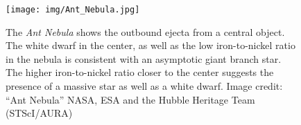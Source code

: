 \begin{figure}
  \centering
  \texttt{[image: img/Ant\_Nebula.jpg]}
  \caption[Ant Nebula]{\label{img:ant-nebula}
    The \textit{Ant Nebula} shows the outbound ejecta from a central object.
    The white dwarf in the center, as well as the low iron-to-nickel ratio in the nebula is consistent with an asymptotic giant branch star.
    The higher iron-to-nickel ratio closer to the center suggests the presence of a massive star as well as a white dwarf.
    Image credit: ``Ant Nebula'' NASA, ESA and the Hubble Heritage Team (STScI/AURA)
  }
\end{figure}
